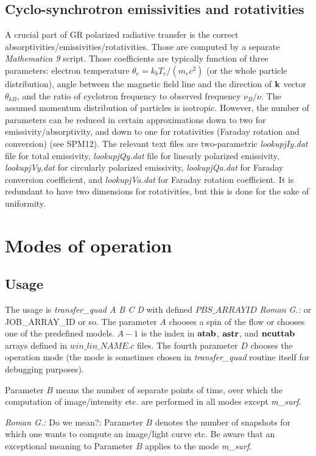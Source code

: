 \documentclass{emulateapj}
\newcommand{\mat}{\textit{Mathematica 9 }}
\newcommand{\rg}[1]{\color{blue}\textit{Roman G.:} #1\color{black}}
\begin{document}
\subsection{Cyclo-synchrotron emissivities and rotativities}
A crucial part of GR polarized radiative transfer is the correct
absorptivities/emissivities/rotativities.  Those are computed by a
separate \mat script. Those coefficients are typically function of
three parameters: electron temperature $\theta_e=k_b T_e/(m_e c^2)$
(or the whole particle distribution), angle between the magnetic field
line and the direction of ${\bf k}$ vector $\theta_{kB}$, and the
ratio of cyclotron frequency to observed frequency $\nu_B/\nu$. The
assumed momentum distribution of particles is isotropic.  However, the
number of parameters can be reduced in certain approximations down to
two for emissivity/absorptivity, and down to one for rotativities
(Faraday rotation and conversion) (see SPM12). The relevant text files
are two-parametric \textit{lookupjIy.dat} file for total emissivity,
\textit{lookupjQy.dat} file for linearly polarized emissivity,
\textit{lookupjVy.dat} for circularly polarized emissivity,
\textit{lookupjQa.dat} for Faraday conversion coefficient, and
\textit{lookupjVa.dat} for Faraday rotation coefficient. It is
redundant to have two dimensions for rotativities, but this is done
for the sake of uniformity.

\section{Modes of operation}
\subsection{Usage}
The usage is \textit{transfer\_quad A B C D} with defined
$PBS\_ARRAYID$ \rg{or JOB\_ARRAY\_ID or so}.  The parameter $A$ chooses
a spin of the flow or chooses one of the predefined models. $A-1$ is
the index in ${\bf atab}$, ${\bf astr}$, and ${\bf ncuttab}$ arrays
defined in $\textit{win\_lin\_NAME.c}$ files. The fourth parameter $D$
chooses the operation mode (the mode is sometimes chosen in
\textit{transfer\_quad} routine itself for debugging purposes).

Parameter $B$ means the number of separate points of time, over which
the computation of image/intensity etc. are performed in all modes
except \textit{m\_surf}.  

\rg{Do we mean?: Parameter $B$ denotes the number of snapshots for
  which one wants to compute an image/light curve etc. Be aware that
  an exceptional meaning to Parameter $B$ applies to the mode
  \textit{m\_surf}. }
\end{document}
